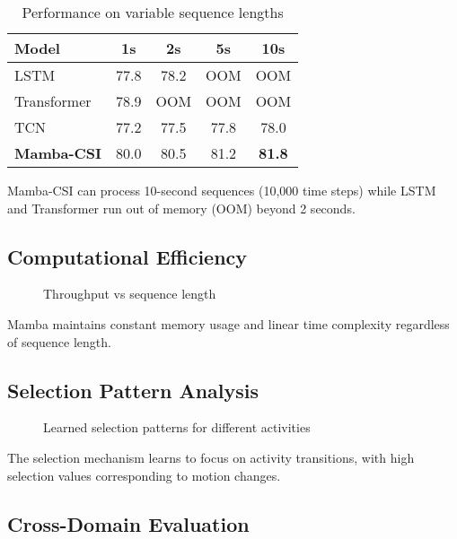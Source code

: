 \documentclass[10pt,conference]{IEEEtran}
\begin{document}
\begin{table}[h]
\centering
\caption{Performance on variable sequence lengths}
\label{tab:sequence_length}
\begin{tabular}{lcccc}
\toprule
Model & 1s & 2s & 5s & 10s \\
\midrule
LSTM & 77.8 & 78.2 & OOM & OOM \\
Transformer & 78.9 & OOM & OOM & OOM \\
TCN & 77.2 & 77.5 & 77.8 & 78.0 \\
\textbf{Mamba-CSI} & 80.0 & 80.5 & 81.2 & \textbf{81.8} \\
\bottomrule
\end{tabular}
\end{table}

Mamba-CSI can process 10-second sequences (10,000 time steps) while LSTM and Transformer run out of memory (OOM) beyond 2 seconds.

\subsection{Computational Efficiency}

\begin{figure}[h]
\centering
\framebox[0.45\textwidth]{\rule{0pt}{3cm}}
\caption{Throughput vs sequence length}
\label{fig:throughput}
\end{figure}

Mamba maintains constant memory usage and linear time complexity regardless of sequence length.

\subsection{Selection Pattern Analysis}

\begin{figure}[h]
\centering
\framebox[0.45\textwidth]{\rule{0pt}{3cm}}
\caption{Learned selection patterns for different activities}
\label{fig:selection}
\end{figure}

The selection mechanism learns to focus on activity transitions, with high selection values corresponding to motion changes.

\subsection{Cross-Domain Evaluation}
\end{document}
